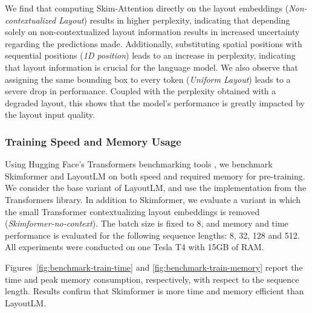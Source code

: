 We find that computing Skim-Attention directly on the layout embeddings (\textit{Non-contextualized Layout}) results in higher perplexity, indicating that depending solely on non-contextualized layout information results in increased uncertainty regarding the predictions made. Additionally, substituting spatial positions with sequential positions (\textit{1D position}) leads to an increase in perplexity, indicating that layout information is crucial for the language model. We also observe that assigning the same bounding box to every token (\textit{Uniform Layout}) leads to a severe drop in performance. Coupled with the perplexity obtained with a degraded layout, this shows that the model's performance is greatly impacted by the layout input quality. 

\subsubsection{Training Speed and Memory Usage}
\label{subsubsection:training-speed-memory-usage}

Using Hugging Face's Transformers benchmarking tools \citep{wolf2019huggingface}, we benchmark Skimformer and LayoutLM on both speed and required memory for pre-training. We consider the base variant of LayoutLM, and use the implementation from the Transformers library. In addition to Skimformer, we evaluate a variant in which the small Transformer contextualizing layout embeddings is removed (\textit{Skimformer-no-context}). The batch size is fixed to 8, and memory and time performance is evaluated for the following sequence lengths: 8, 32, 128 and 512. All experiments were conducted on one Tesla T4 with 15GB of RAM.


Figures~\ref{fig:benchmark-train-time} and \ref{fig:benchmark-train-memory} report the time and peak memory consumption, respectively, with respect to the sequence length. Results confirm that Skimformer is more time and memory efficient than LayoutLM. 

